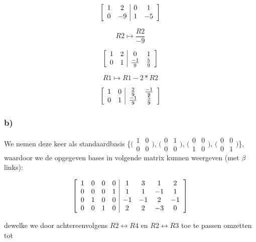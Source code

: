 \documentclass[lineaire_algebra_oplossingen.tex]{subfiles}
\begin{document}
\[
\left[
\begin{array}{ c c | c c }
1 & 2 & 0 & 1\\
0 & -9 & 1 & -5
\end{array}
\right]
\]

\[R2 \mapsto \frac{R2}{-9} \]

\[
\left[
\begin{array}{ c c | c c }
1 & 2 & 0 & 1\\
0 & 1 & \frac{-1}{9} & \frac{5}{9}
\end{array}
\right]
\]

\[R1 \mapsto R1 - 2*R2 \]

\[
\left[
\begin{array}{ c c | c c }
1 & 0 & \frac{2}{9} & \frac{-1}{9}\\
0 & 1 & \frac{-1}{9} & \frac{5}{9}
\end{array}
\right]
\]

\subsubsection*{b)}

We nemen deze keer als standaardbasis \{$\bigl(
\begin{smallmatrix}
1&0\\ 0&0
\end{smallmatrix}
\bigr)$,
$\bigl(
\begin{smallmatrix}
0&1\\ 0&0
\end{smallmatrix}
\bigr)$,
$\bigl(
\begin{smallmatrix}
0&0\\ 1&0
\end{smallmatrix}
\bigr)$,
$\bigl(
\begin{smallmatrix}
0&0\\ 0&1
\end{smallmatrix}
\bigr)$\}, waardoor we de opgegeven bases in volgende matrix kunnen weergeven (met $\beta$ links):

\[
\left[
\begin{array}{ c c c c | c c c c }
1 & 0 & 0 & 0 & 1 & 3 & 1 & 2\\
0 & 0 & 0 & 1 & 1 & 1 & -1 & 1\\
0 & 1 & 0 & 0 & -1 & -1 & 2 & -1\\
0 & 0 & 1 & 0 & 2 & 2 & -3 & 0
\end{array}
\right]
\]

dewelke we door achtereenvolgens $R2 \leftrightarrow R4$ en $R2 \leftrightarrow R3$ toe te passen omzetten tot
\end{document}

